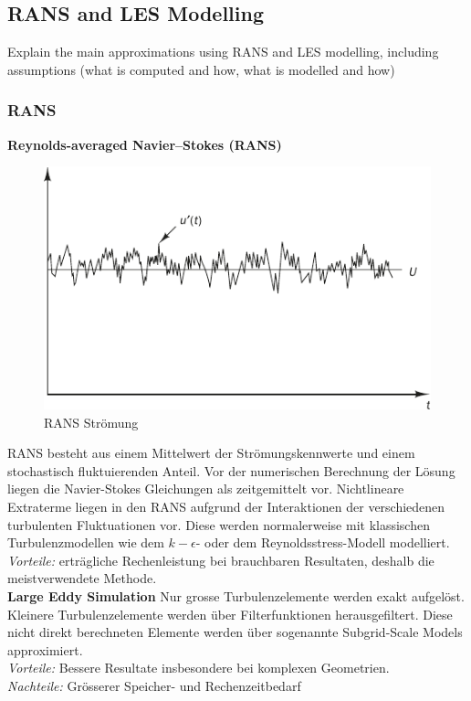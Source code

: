\documentclass[a4paper]{scrartcl}
\begin{document}
\subsection{RANS and LES Modelling}
Explain the main approximations using RANS
and LES modelling, including assumptions (what is computed and how, what is modelled and how)
\subsubsection{RANS}
\textbf{Reynolds-averaged Navier–Stokes (RANS)}

\begin{figure}[h]
\begin{center}
\includegraphics[scale=1]{images/51.pdf}
\caption{RANS Strömung}
\label{fig:41}
\end{center}
\end{figure}

RANS besteht aus einem Mittelwert der Strömungskennwerte und einem stochastisch
fluktuierenden Anteil. Vor der numerischen Berechnung der Lösung liegen die
Navier-Stokes Gleichungen als zeitgemittelt vor. Nichtlineare Extraterme liegen
in den RANS aufgrund der Interaktionen der verschiedenen turbulenten Fluktuationen vor.
Diese werden normalerweise mit klassischen Turbulenzmodellen wie dem
$k-\epsilon$- oder dem Reynoldsstress-Modell modelliert.
\\
\textit{Vorteile:} erträgliche Rechenleistung bei brauchbaren Resultaten,
deshalb die meistverwendete Methode. \\
\vspace{0.5cm}
\textbf{Large Eddy Simulation}
Nur grosse Turbulenzelemente werden exakt aufgelöst. Kleinere Turbulenzelemente
werden über Filterfunktionen herausgefiltert. Diese nicht direkt berechneten
Elemente werden über sogenannte Subgrid-Scale Models approximiert. \\
\vspace{0.5cm}
\textit{Vorteile:} Bessere Resultate insbesondere bei komplexen Geometrien. \\
\textit{Nachteile:} Grösserer Speicher- und Rechenzeitbedarf
\end{document}

